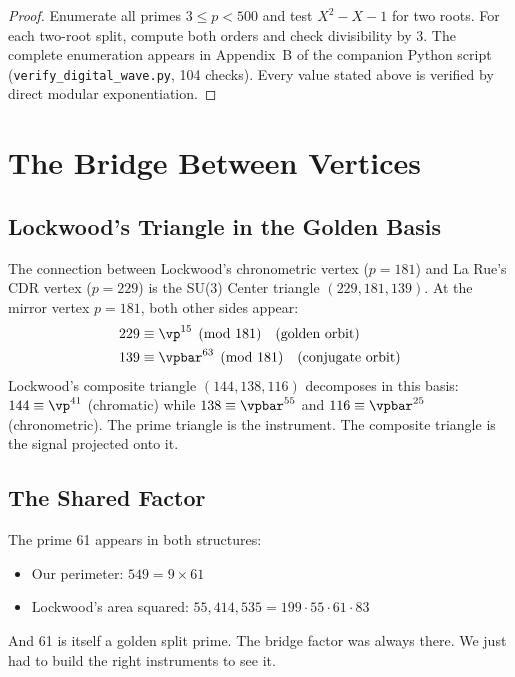 \begin{proof}
Enumerate all primes $3 \leq p < 500$ and test $X^2 - X - 1$ for two roots. For each two-root split, compute both orders and check divisibility by 3. The complete enumeration appears in Appendix~B of the companion Python script (\texttt{verify\_digital\_wave.py}, 104 checks). Every value stated above is verified by direct modular exponentiation. \qedhere
\end{proof}


\section{The Bridge Between Vertices}

\subsection{Lockwood's Triangle in the Golden Basis}

The connection between Lockwood's chronometric vertex ($p = 181$) and La Rue's CDR vertex ($p = 229$) is the SU(3) Center triangle $(229, 181, 139)$. At the mirror vertex $p = 181$, both other sides appear:
\begin{align}
229 &\equiv \vp^{15} \pmod{181} \quad \text{(golden orbit)} \\
139 &\equiv \vpbar^{63} \pmod{181} \quad \text{(conjugate orbit)}
\end{align}
Lockwood's composite triangle $(144, 138, 116)$ decomposes in this basis: $144 \equiv \vp^{41}$ (chromatic) while $138 \equiv \vpbar^{55}$ and $116 \equiv \vpbar^{25}$ (chronometric). The prime triangle is the instrument. The composite triangle is the signal projected onto it.

\subsection{The Shared Factor}

The prime 61 appears in both structures:
\begin{itemize}
\item Our perimeter: $549 = 9 \times 61$
\item Lockwood's area squared: $55{,}414{,}535 = 199 \cdot 55 \cdot 61 \cdot 83$
\end{itemize}
And 61 is itself a golden split prime. The bridge factor was always there. We just had to build the right instruments to see it.


